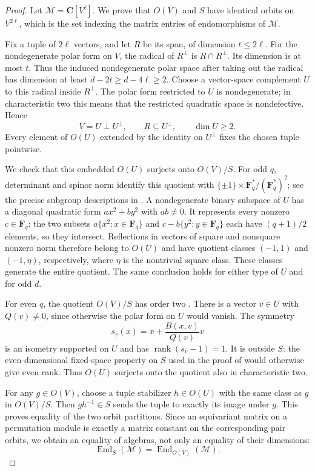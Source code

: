 \begin{proof}
Let $\mathcal M=\mathbf C[V^\ell]$.  We prove that $O(V)$ and $S$
have identical orbits on $V^{2\ell}$, which is the set indexing the
matrix entries of endomorphisms of $\mathcal M$.

Fix a tuple of $2\ell$ vectors, and let $R$ be its span, of dimension
$t\le2\ell$.  For the nondegenerate polar form on $V$, the radical
of $R^\perp$ is $R\cap R^\perp$.  Its dimension is at most $t$.
Thus the induced nondegenerate polar space after taking out the radical
has dimension at least $d-2t\ge d-4\ell\ge2$.  Choose a vector-space
complement $U$ to this radical inside $R^\perp$.  The polar form
restricted to $U$ is nondegenerate; in characteristic two this means
that the restricted quadratic space is nondefective.  Hence
\[
 V=U\perp U^\perp,\qquad R\subseteq U^\perp,\qquad \dim U\ge2.
                                                               \tag{OL4.3}
\]
Every element of $O(U)$ extended by the identity on $U^\perp$ fixes
the chosen tuple pointwise.

We check that this embedded $O(U)$ surjects onto $O(V)/S$.
For odd $q$, determinant and spinor norm identify this quotient with
$\{\pm1\}\times\mathbf F_q^*/(\mathbf F_q^*)^2$;
see the precise subgroup descriptions in
\cite[Section~2, pp.~41--43]{OL:KTV2023}.
A nondegenerate binary subspace of $U$ has a diagonal quadratic form
$ax^2+by^2$ with $ab\ne0$.  It represents every nonzero $c\in\mathbf F_q$:
the two subsets $a\{x^2:x\in\mathbf F_q\}$ and
$c-b\{y^2:y\in\mathbf F_q\}$ each have $(q+1)/2$ elements, so they
intersect.  Reflections in vectors of square and nonsquare nonzero
norm therefore belong to $O(U)$ and have quotient classes
$(-1,1)$ and $(-1,\eta)$, respectively, where $\eta$ is the
nontrivial square class.  These classes generate the entire quotient.
The same conclusion holds for either type of $U$ and for odd $d$.

For even $q$, the quotient $O(V)/S$ has order two
\cite[Section~2, p.~42]{OL:KTV2023}.  There is a vector $v\in U$
with $Q(v)\ne0$, since otherwise the polar form on $U$ would vanish.
The symmetry
\[
              s_v(x)=x+\frac{B(x,v)}{Q(v)}v                    \tag{OL4.4}
\]
is an isometry supported on $U$ and has $\operatorname{rank}(s_v-1)=1$.
It is outside $S$: the even-dimensional fixed-space property on $S$
used in the proof of \cite[Lemma~3.3, p.~160]{OL:GLT2024} would
otherwise give even rank.  Thus $O(U)$ surjects onto the quotient
also in characteristic two.

For any $g\in O(V)$, choose a tuple stabilizer $h\in O(U)$ with the
same class as $g$ in $O(V)/S$.  Then $gh^{-1}\in S$ sends the tuple
to exactly its image under $g$.  This proves equality of the two orbit
partitions.  Since an equivariant matrix on a permutation module is
exactly a matrix constant on the corresponding pair orbits, we obtain
an equality of algebras, not only an equality of their dimensions:
\[
       \operatorname{End}_{S}(\mathcal M)
       =\operatorname{End}_{O(V)}(\mathcal M).                 \tag{OL4.5}
\]


\end{proof}
